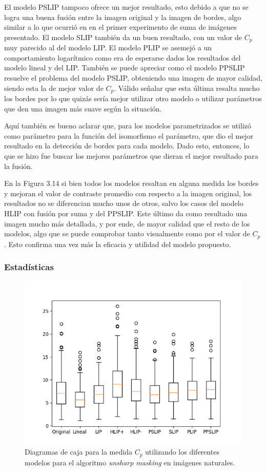 El modelo PSLIP tampoco ofrece un mejor resultado, esto debido a que no se logra una buena fusi\'on entre la imagen original y la imagen de bordes, algo similar a lo que ocurri\'o en en el primer experimento de suma de im\'agenes presentado. El modelo SLIP tambi\'en da un buen resultado, con un valor de $C_p$ muy parecido al del modelo LIP. El modelo PLIP se asemej\'o a un comportamiento logar\'itmico como era de esperarse dados los resultados del modelo lineal y del LIP. Tambi\'en se puede apreciar como el modelo PPSLIP resuelve el problema del modelo PSLIP, obteniendo una imagen de mayor calidad, siendo esta la de mejor valor de $C_p$. V\'alido se\~nalar que esta \'ultima resalta mucho los bordes por lo que quiz\'as ser\'ia mejor utilizar otro modelo o utilizar par\'ametros que den una imagen m\'as suave seg\'un la situaci\'on.

Aqu\'i tambi\'en es bueno aclarar que, para los modelos parametrizados se utiliz\'o como par\'ametro para la funci\'on del isomorfismo el par\'ametro, que dio el mejor resultado en la detecci\'on de bordes para cada modelo. Dado esto, entonces, lo que se hizo fue buscar los mejores par\'ametros que dieran el mejor resultado para la fusi\'on.

En la Figura 3.14 si bien todos los modelos resaltan en alguna medida los bordes y mejoran el valor de contraste promedio con respecto a la imagen original, los resultados no se diferencian mucho unos de otros, salvo los casos del modelo HLIP con fusi\'on por suma y del PPSLIP. Este \'ultimo da como resultado una imagen mucho m\'as detallada, y por ende, de mayor calidad que el resto de los modelos, algo que se puede comprobar tanto visualmente como por el valor de $C_p$. Esto confirma una vez m\'as la eficacia y utilidad del modelo propuesto.

\subsubsection{Estad\'isticas}

\begin{figure}
	\begin{center}
		\includegraphics[width=10.0 cm]{images/graphics/natural/unsharp_masking/um_all.png}
		\caption{Diagramas de caja para la medida $C_p$ utilizando los diferentes modelos para el algoritmo \textit{unsharp masking} en im\'agenes naturales.}
	\end{center}
\end{figure}

